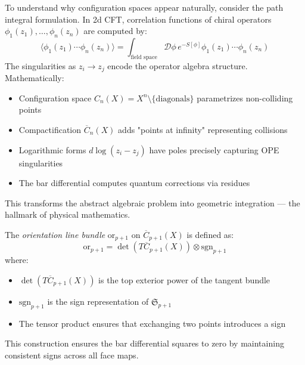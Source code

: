\begin{remark}
To understand why configuration spaces appear naturally, consider the path integral formulation. In 2d CFT, correlation functions of chiral operators $\phi_1(z_1), \ldots, \phi_n(z_n)$ are computed by:
\[
\langle \phi_1(z_1) \cdots \phi_n(z_n) \rangle = \int_{\text{field space}} \mathcal{D}\phi \, e^{-S[\phi]} \phi_1(z_1) \cdots \phi_n(z_n)
\]
The singularities as $z_i \to z_j$ encode the operator algebra structure. Mathematically:
\begin{itemize}
\item Configuration space $C_n(X) = X^n \setminus \{\text{diagonals}\}$ parametrizes non-colliding points
\item Compactification $\overline{C}_n(X)$ adds "points at infinity" representing collisions
\item Logarithmic forms $d\log(z_i - z_j)$ have poles precisely capturing OPE singularities
\item The bar differential computes quantum corrections via residues
\end{itemize}
This transforms the abstract algebraic problem into geometric integration --- the hallmark of physical mathematics.
\end{remark}

\begin{definition}\label{def:orientation}
The \emph{orientation line bundle} $\text{or}_{p+1}$ on $\overline{C}_{p+1}(X)$ is defined as:
\[
\text{or}_{p+1} = \det(T\overline{C}_{p+1}(X)) \otimes \text{sgn}_{p+1}
\]
where:
\begin{itemize}
\item $\det(T\overline{C}_{p+1}(X))$ is the top exterior power of the tangent bundle
\item $\text{sgn}_{p+1}$ is the sign representation of $\mathfrak{S}_{p+1}$
\item The tensor product ensures that exchanging two points introduces a sign
\end{itemize}
This construction ensures the bar differential squares to zero by maintaining consistent signs across all face maps.
\end{definition}

